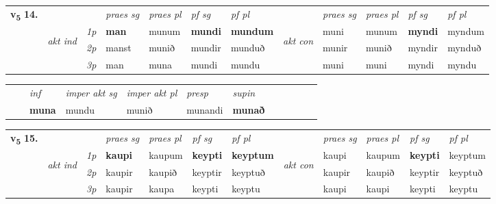 \begin{tabular}{llllllllllll} \toprule
\multirow{4}{*}{{{\textbf{v{\textsubscript{5}}} \Large{\textbf{14.}}}}}  & &   &  \textit{praes sg}  & \textit{praes pl}  &\textit{ pf sg} & \textit{pf pl} &  &  \textit{praes sg}  & \textit{praes pl}  & \textit{pf sg} & \textit{pf pl } \\*
	\cmidrule{4-7} \cmidrule{9-12}
 & \multirow{3}{*}{\begin{turn}{90}\textit{akt ind}\end{turn}} & {\textit{1p}} & \textbf{man} & munum    & \textbf{mundi} & \textbf{mundum} & \multirow{3}{*}{\begin{turn}{90}\textit{akt con}\end{turn}} &muni & munum & \textbf{myndi} & myndum\\*
& &  {\textit{2p}} &  manst  & munið   & mundir & munduð & & munir & munið & myndir & mynduð \\*
& &  {\textit{3p}} & man & muna   & mundi & mundu & & muni & muni& myndi & myndu  \\*
\cmidrule{4-7} \cmidrule{9-12}
\end{tabular}


\begin{tabular}{llllllllllll}
 & & \textit{inf} & \textit{imper akt sg} & \textit{imper akt pl}   & \textit{presp} & \textit{supin}       \\*
  & & \textbf{muna} & mundu  & munið   & munandi &  \textbf{munað}   \\*
\cmidrule{1-12}
\end{tabular}



\begin{tabular}{llllllllllll} \toprule
\multirow{4}{*}{{{\textbf{v{\textsubscript{5}}} \Large{\textbf{15.}}}}}  & &   &  \textit{praes sg}  & \textit{praes pl}  &\textit{ pf sg} & \textit{pf pl} &  &  \textit{praes sg}  & \textit{praes pl}  & \textit{pf sg} & \textit{pf pl } \\*
	\cmidrule{4-7} \cmidrule{9-12}
 & \multirow{3}{*}{\begin{turn}{90}\textit{akt ind}\end{turn}} & {\textit{1p}} & \textbf{kaupi} & kaupum    & \textbf{keypti} & \textbf{keyptum} & \multirow{3}{*}{\begin{turn}{90}\textit{akt con}\end{turn}} &kaupi & kaupum & \textbf{keypti} & keyptum\\*
& &  {\textit{2p}} &  kaupir  & kaupið   & keyptir & keyptuð & & kaupir & kaupið & keyptir & keyptuð \\*
& &  {\textit{3p}} & kaupir & kaupa   & keypti & keyptu & & kaupi & kaupi& keypti & keyptu  \\*
\cmidrule{4-7} \cmidrule{9-12}
\end{tabular}


